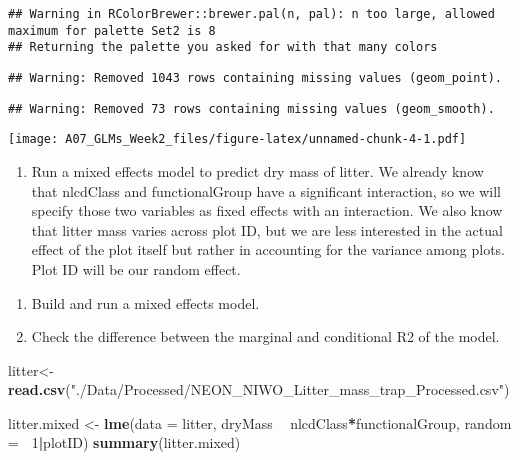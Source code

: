 \documentclass[]{article}
\newenvironment{Shaded}{\begin{snugshade}}{\end{snugshade}}
\newcommand{\DataTypeTok}[1]{\textcolor[rgb]{0.13,0.29,0.53}{#1}}
\newcommand{\DecValTok}[1]{\textcolor[rgb]{0.00,0.00,0.81}{#1}}
\newcommand{\KeywordTok}[1]{\textcolor[rgb]{0.13,0.29,0.53}{\textbf{#1}}}
\newcommand{\NormalTok}[1]{#1}
\newcommand{\OperatorTok}[1]{\textcolor[rgb]{0.81,0.36,0.00}{\textbf{#1}}}
\newcommand{\StringTok}[1]{\textcolor[rgb]{0.31,0.60,0.02}{#1}}
\providecommand{\tightlist}{%
  \setlength{\itemsep}{0pt}\setlength{\parskip}{0pt}}
\begin{document}
\begin{verbatim}
## Warning in RColorBrewer::brewer.pal(n, pal): n too large, allowed maximum for palette Set2 is 8
## Returning the palette you asked for with that many colors
\end{verbatim}

\begin{verbatim}
## Warning: Removed 1043 rows containing missing values (geom_point).
\end{verbatim}

\begin{verbatim}
## Warning: Removed 73 rows containing missing values (geom_smooth).
\end{verbatim}

\texttt{[image: A07\_GLMs\_Week2\_files/figure-latex/unnamed-chunk-4-1.pdf]}

\begin{enumerate}
\def\labelenumi{\arabic{enumi}.}
\setcounter{enumi}{8}
\tightlist
\item
  Run a mixed effects model to predict dry mass of litter. We already
  know that nlcdClass and functionalGroup have a significant
  interaction, so we will specify those two variables as fixed effects
  with an interaction. We also know that litter mass varies across plot
  ID, but we are less interested in the actual effect of the plot itself
  but rather in accounting for the variance among plots. Plot ID will be
  our random effect.
\end{enumerate}

\begin{enumerate}
\def\labelenumi{\alph{enumi}.}
\tightlist
\item
  Build and run a mixed effects model.
\item
  Check the difference between the marginal and conditional R2 of the
  model.
\end{enumerate}

\begin{Shaded}
\begin{Highlighting}[]
\NormalTok{litter<-}\StringTok{ }\KeywordTok{read.csv}\NormalTok{(}\StringTok{"./Data/Processed/NEON_NIWO_Litter_mass_trap_Processed.csv"}\NormalTok{)}

\NormalTok{litter.mixed <-}\StringTok{ }\KeywordTok{lme}\NormalTok{(}\DataTypeTok{data =}\NormalTok{ litter,}
\NormalTok{                     dryMass }\OperatorTok{~}\StringTok{ }\NormalTok{nlcdClass}\OperatorTok{*}\NormalTok{functionalGroup, }
                     \DataTypeTok{random =} \OperatorTok{~}\DecValTok{1}\OperatorTok{|}\NormalTok{plotID)}
\KeywordTok{summary}\NormalTok{(litter.mixed)}
\end{Highlighting}
\end{Shaded}
\end{document}
